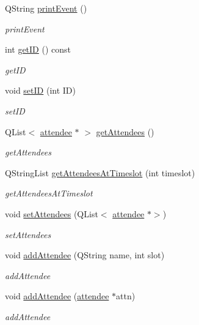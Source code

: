 \begin{DoxyCompactItemize}
Q\+String \hyperlink{class_event_ab2c59affdf5f762ecedd77a689ba08de}{print\+Event} ()
\begin{DoxyCompactList}\small\item\em print\+Event \end{DoxyCompactList}\item 
int \hyperlink{class_event_a019343d5fbe993108f49362f134ef746}{get\+ID} () const
\begin{DoxyCompactList}\small\item\em get\+ID \end{DoxyCompactList}\item 
void \hyperlink{class_event_a3c90e712012a92068a2fb14e302de0be}{set\+ID} (int ID)
\begin{DoxyCompactList}\small\item\em set\+ID \end{DoxyCompactList}\item 
Q\+List$<$ \hyperlink{classattendee}{attendee} $\ast$ $>$ \hyperlink{class_event_a56f9898f75ae301df1d10523de57f500}{get\+Attendees} ()
\begin{DoxyCompactList}\small\item\em get\+Attendees \end{DoxyCompactList}\item 
Q\+String\+List \hyperlink{class_event_adb10c77700599fb4c6047fd8f4476beb}{get\+Attendees\+At\+Timeslot} (int timeslot)
\begin{DoxyCompactList}\small\item\em get\+Attendees\+At\+Timeslot \end{DoxyCompactList}\item 
void \hyperlink{class_event_af632e4550dcd4eb70c5a45c57af615b7}{set\+Attendees} (Q\+List$<$ \hyperlink{classattendee}{attendee} $\ast$$>$)
\begin{DoxyCompactList}\small\item\em set\+Attendees \end{DoxyCompactList}\item 
void \hyperlink{class_event_a0940f63f5ac2324d7c61e204ed782bd0}{add\+Attendee} (Q\+String name, int slot)
\begin{DoxyCompactList}\small\item\em add\+Attendee \end{DoxyCompactList}\item 
void \hyperlink{class_event_a7be36f174942f39cab6917d09e139a14}{add\+Attendee} (\hyperlink{classattendee}{attendee} $\ast$attn)
\begin{DoxyCompactList}\small\item\em add\+Attendee \end{DoxyCompactList}\item 
$$
\end{DoxyCompactItemize}
